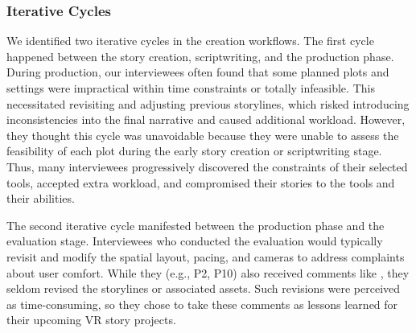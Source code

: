 \subsubsection{Iterative Cycles}
\label{sec:processes_iterative_cycles}
We identified two iterative cycles in the creation workflows. The first cycle happened between the story creation, scriptwriting, and the production phase. During production, our interviewees often found that some planned plots and settings were impractical within time constraints or totally infeasible.
This necessitated revisiting and adjusting previous storylines, which risked introducing inconsistencies into the final narrative and caused additional workload. However, they thought this cycle was unavoidable because they were unable to assess the feasibility of each plot during the early story creation or scriptwriting stage. 
Thus, many interviewees progressively discovered the constraints of their selected tools, accepted extra workload, and compromised their stories to the tools and their abilities.

The second iterative cycle manifested between the production phase and the evaluation stage. Interviewees who conducted the evaluation would typically revisit and modify the spatial layout, pacing, and cameras to address complaints about user comfort. While they (e.g., P2, P10) also received comments like , they seldom revised the storylines or associated assets. Such revisions were perceived as time-consuming, so they chose to take these comments as lessons learned for their upcoming VR story projects.
